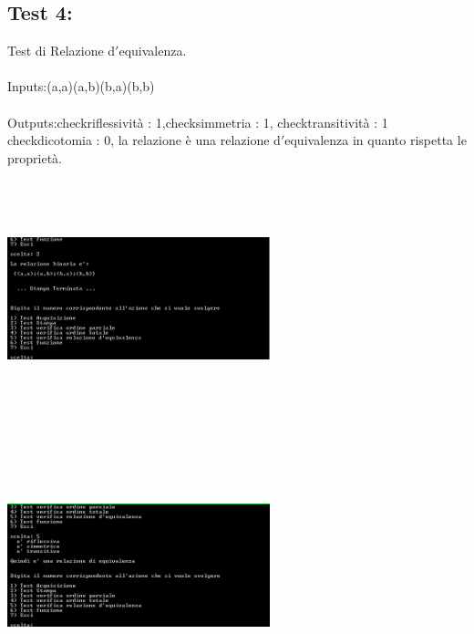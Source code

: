 \documentclass[11pt, a4paper, titlepage, block]{article}
\begin{document}
	\subsection{Test 4:}
	Test di Relazione d$'$equivalenza.\\
	\\
	Inputs:(a,a)(a,b)(b,a)(b,b)\\
	\\
	Outputs:checkriflessivit\`a : 1,checksimmetria : 1, checktransitivit\`a : 1
	checkdicotomia : 0, la relazione \`e una relazione d$'$equivalenza in quanto rispetta le propriet\`a.\\
	\includegraphics[width=3in,height=3in,viewport=0 0 300 300]{../Screenshots/Test4Input.png}
	\\
	\includegraphics[width=3in,height=3in,viewport=0 0 300 300]{../Screenshots/Test4Output.png}
	\\
	\\
	\newpage
\end{document}
